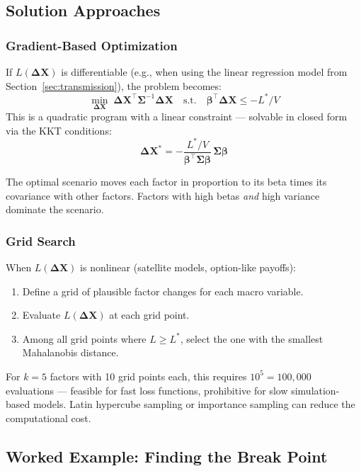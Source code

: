 \documentclass[11pt, a4paper]{article}
\theoremstyle{definition}
\theoremstyle{plain}
\theoremstyle{remark}
\begin{document}
\subsection{Solution Approaches}

\subsubsection{Gradient-Based Optimization}

If $L(\bm{\Delta X})$ is differentiable (e.g., when using the linear regression model from Section~\ref{sec:transmission}),
the problem becomes:
\[
    \min_{\bm{\Delta X}} \; \bm{\Delta X}^\top \bm{\Sigma}^{-1} \bm{\Delta X}
    \quad \text{s.t.} \quad \bm{\beta}^\top \bm{\Delta X} \leq -L^* / V
\]
This is a quadratic program with a linear constraint --- solvable in closed form via the KKT conditions:
\[
    \bm{\Delta X}^* = -\frac{L^* / V}{\bm{\beta}^\top \bm{\Sigma} \bm{\beta}} \, \bm{\Sigma} \bm{\beta}
\]

The optimal scenario moves each factor in proportion to its beta times its covariance with other factors.
Factors with high betas \emph{and} high variance dominate the scenario.

\subsubsection{Grid Search}

When $L(\bm{\Delta X})$ is nonlinear (satellite models, option-like payoffs):
\begin{enumerate}
    \item Define a grid of plausible factor changes for each macro variable.
    \item Evaluate $L(\bm{\Delta X})$ at each grid point.
    \item Among all grid points where $L \geq L^*$,
          select the one with the smallest Mahalanobis distance.
\end{enumerate}

For $k = 5$ factors with 10 grid points each, this requires $10^5 = 100{,}000$ evaluations ---
feasible for fast loss functions, prohibitive for slow simulation-based models.
Latin hypercube sampling or importance sampling can reduce the computational cost.

\subsection{Worked Example: Finding the Break Point}
\end{document}
